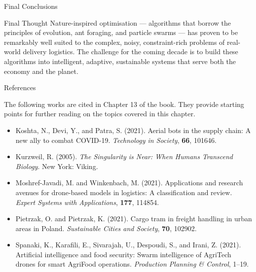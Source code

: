 \documentclass[aspectratio=169,10pt]{beamer}
\begin{document}
\begin{frame}[allowframebreaks]{Final Conclusions}
  \bigskip
  \begin{alertblock}{Final Thought}
    Nature-inspired optimisation --- algorithms that borrow
    the principles of evolution, ant foraging, and particle
    swarms --- has proven to be remarkably well suited to the
    complex, noisy, constraint-rich problems of real-world
    delivery logistics.  The challenge for the coming decade
    is to build these algorithms into intelligent, adaptive,
    sustainable systems that serve both the economy and the
    planet.
  \end{alertblock}

\end{frame}

\begin{frame}[allowframebreaks]{References}

  The following works are cited in Chapter 13 of the book.
  They provide starting points for further reading on the
  topics covered in this chapter.

  \bigskip
  \begin{small}
  \begin{itemize}
    \item Koshta, N., Devi, Y., and Patra, S. (2021).
          Aerial bots in the supply chain: A new ally to combat
          COVID-19. \textit{Technology in Society}, \textbf{66},
          101646.

    \item Kurzweil, R. (2005).
          \textit{The Singularity is Near: When Humans Transcend
          Biology}. New York: Viking.

    \item Moshref-Javadi, M. and Winkenbach, M. (2021).
          Applications and research avenues for drone-based
          models in logistics: A classification and review.
          \textit{Expert Systems with Applications}, \textbf{177},
          114854.

    \item Pietrzak, O. and Pietrzak, K. (2021).
          Cargo tram in freight handling in urban areas in Poland.
          \textit{Sustainable Cities and Society}, \textbf{70},
          102902.

    \item Spanaki, K., Karafili, E., Sivarajah, U., Despoudi, S.,
          and Irani, Z. (2021).
          Artificial intelligence and food security: Swarm
          intelligence of AgriTech drones for smart AgriFood
          operations.
          \textit{Production Planning \& Control}, 1--19.
  \end{itemize}
  \end{small}

\end{frame}
\end{document}
